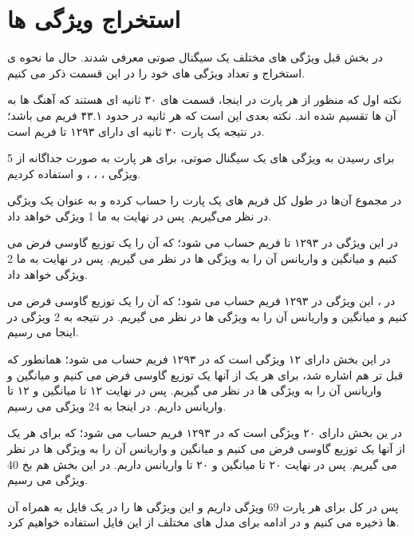 \documentclass[12pt,onecolumn,a4paper]{article}
\begin{document}
\section{استخراج ویژگی ها}
در بخش قبل ویژگی های مختلف یک سیگنال صوتی معرفی شدند.
حال ما نحوه ی استخراج و تعداد ویژگی های خود را در این قسمت ذکر می کنیم.

نکته اول که منظور از هر پارت در اینجا، قسمت های ۳۰ ثانیه ای هستند که آهنگ ها به آن ها تقسیم شده اند.
نکته بعدی این است که هر ثانیه در حدود ۴۳.۱  فریم می باشد؛ در نتیجه یک پارت ۳۰ ثانیه ای دارای ۱۲۹۳ تا فریم است.

برای رسیدن به ویژگی های یک سیگنال صوتی، برای هر پارت به صورت جداگانه از 5 ویژگی ، ، ،  و  استفاده کردیم.

در  مجموع آن‌ها در طول کل فریم های یک پارت را حساب کرده و به عنوان یک ویژگی در نظر می‌گیریم. پس در نهایت به ما 1 ویژگی خواهد داد.

در   این ویژگی در ۱۲۹۳ تا فریم حساب می شود؛ که آن را یک توزیع گاوسی فرض می کنیم و میانگین و واریانس آن را به ویژگی ها در نظر می گیریم. پس در نهایت به ما 2 ویژگی خواهد داد.

در ،  این ویژگی در ۱۲۹۳ فریم حساب می شود؛ که آن را یک توزیع گاوسی فرض می کنیم و میانگین و واریانس آن را به ویژگی ها در نظر می گیریم. در نتیجه به 2 ویژگی در اینجا می رسیم.

در  این بخش دارای ۱۲ ویژگی است که  در ۱۲۹۳ فریم حساب می شود؛ همانطور که قبل تر هم اشاره شد، برای هر یک از آنها یک توزیع گاوسی فرض می کنیم و میانگین و واریانس آن را به ویژگی ها در نظر می گیریم. پس در نهایت ۱۲ تا میانگین و ۱۲ تا واریانس داریم. در اینجا به 24 ویژگی می رسیم.

در  ین بخش دارای ۲۰ ویژگی است که  در ۱۲۹۳ فریم حساب می شود؛ که برای هر یک از آنها یک توزیع گاوسی فرض می کنیم و میانگین و واریانس آن را به ویژگی ها در نظر می گیریم. پس در نهایت ۲۰ تا میانگین و ۲۰ تا واریانس داریم. در این بخش هم بخ 40 ویژگی می رسیم.

پس در کل برای هر پارت 69 ویژگی داریم و این ویژگی ها را در یک فایل  به همراه  آن ها ذخیره می کنیم و در ادامه برای مدل های مختلف از این فایل استفاده خواهیم کرد.
\end{document}
